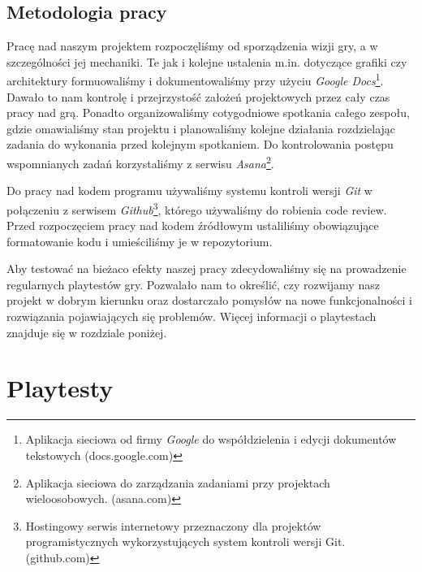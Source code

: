 \documentclass[licencjacka]{pracamgr}
\begin{document}
  \section{Metodologia pracy}
    Pracę nad naszym projektem rozpoczęliśmy od sporządzenia wizji gry, a w szczególności jej mechaniki. Te jak i kolejne
    ustalenia m.in. dotyczące grafiki czy architektury formuowaliśmy i dokumentowaliśmy przy użyciu \emph{Google Docs}\footnote{Aplikacja 
    sieciowa od firmy \emph{Google} do współdzielenia i edycji dokumentów tekstowych (docs.google.com)}. Dawało to nam kontrolę i przejrzystość
    założeń projektowych przez cały czas pracy nad grą. Ponadto organizowaliśmy cotygodniowe spotkania całego zespołu, gdzie omawialiśmy stan projektu
    i planowaliśmy kolejne działania rozdzielając zadania do wykonania przed kolejnym spotkaniem. Do kontrolowania postępu wspomnianych zadań korzystaliśmy
    z serwisu \emph{Asana}\footnote{Aplikacja sieciowa do zarządzania zadaniami przy projektach wieloosobowych. (asana.com)}.

    Do pracy nad kodem programu używaliśmy systemu kontroli wersji \emph{Git} w połączeniu z serwisem \emph{Github}\footnote{Hostingowy
    serwis internetowy przeznaczony dla projektów programistycznych wykorzystujących system kontroli wersji Git. (github.com)}, którego używaliśmy
    do robienia code review. Przed rozpoczęciem pracy nad kodem źródłowym ustaliliśmy obowiązujące formatowanie kodu i umieściliśmy je w repozytorium.

    Aby testować na bieżaco efekty naszej pracy zdecydowaliśmy się na prowadzenie regularnych playtestów gry. Pozwalało nam to określić,
    czy rozwijamy nasz projekt w dobrym kierunku oraz dostarczało pomysłów na nowe funkcjonalności i rozwiązania pojawiających się problemów.
    Więcej informacji o playtestach znajduje się w rozdziale poniżej.

\chapter{Playtesty}
\end{document}
